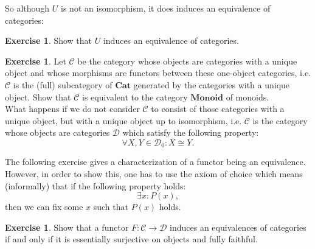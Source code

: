 \documentclass[a4paper,10pt]{scrartcl}
\newcommand{\onlydraft}[1]{} %
\renewcommand{\onlydraft}[1]{#1}  %
\theoremstyle{plain}
\theoremstyle{definition}
\newtheorem{exer}[thm]{Exercise}
\newcommand{\Cat}[1]{\mathcal{#1}}
\newcommand{\CC}{\Cat{C}}
\newcommand{\DD}{\Cat{D}}
\newcommand{\Catb}[1]{\mathbf{#1}}
\newcommand{\CAT}{\Catb{Cat}}
\newcommand{\MON}{\Catb{Monoid}}
\newcommand{\Ob}[1]{{#1}_0}
\begin{document}
So although $U$ is not an isomorphism, it does induces an equivalence of categories:
\begin{exer} Show that $U$ induces an equivalence of categories.
\end{exer}

\begin{exer} Let $\CC$ be the category whose objects are categories with a unique object and whose morphisms are functors between these one-object categories, i.e. $\CC$ is the (full) subcategory of $\CAT$ generated by the categories with a unique object. Show that $\CC$ is equivalent to the category $\MON$ of monoids. \\
What happens if we do not consider $\CC$ to consist of those categories with a unique object, but with a unique object up to isomorphism, i.e. $\CC$ is the category whose objects are categories $\DD$ which satisfy the following property: 
\[
\forall X,Y \in \Ob{\DD}: X\cong Y.
\]
\end{exer}

The following exercise gives a characterization of a functor being an equivalence. However, in order to show this, one has to use the axiom of choice which means (informally) that if the following property holds:
\[ 
\exists x: P(x),
\]
then we can fix some $x$ such that $P(x)$ holds.
\begin{exer} Show that a functor $F:\CC\to\DD$ induces an equivalences of categories if and only if it is essentially surjective on objects and fully faithful.
\end{exer}



\onlydraft{}

\onlydraft{}

\onlydraft{}



\printbibliography
\end{document}
